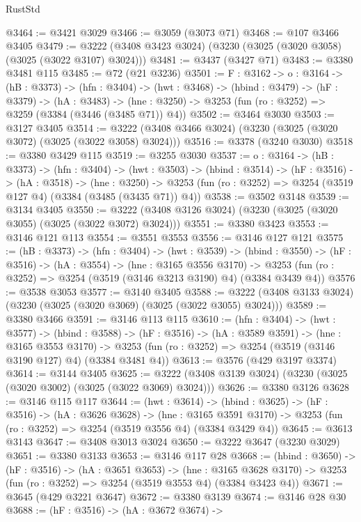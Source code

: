 \begin{lexlean}{RustStd}
\begin{coremodule}
{\begin{coremodule}
{{{{@3464 := @3421 @3029
@3466 := @3059 (@3073 @71)
@3468 := @107 @3466 @3405
@3479 := @3222 (@3408 @3423 @3024) (@3230 (@3025 (@3020 @3058) (@3025 (@3022 @3107) @3024)))
@3481 := @3437 (@3427 @71)
@3483 := @3380 @3481 @115
@3485 := @72 (@21 @3236)
@3501 := {F : @3162} ->
  {o : @3164} ->
  (hB : @3373) ->
  (hfn : @3404) ->
  (hwt : @3468) ->
  (hbind : @3479) ->
  (hF : @3379) ->
  (hA : @3483) -> (hne : @3250) -> @3253 (fun (ro : @3252) => @3259 (@3384 (@3446 (@3485 @71)) @4))
@3502 := @3464 @3030
@3503 := @3127 @3405
@3514 := @3222 (@3408 @3466 @3024) (@3230 (@3025 (@3020 @3072) (@3025 (@3022 @3058) @3024)))
@3516 := @3378 (@3240 @3030)
@3518 := @3380 @3429 @115
@3519 := @3255 @3030
@3537 := {o : @3164} ->
  (hB : @3373) ->
  (hfn : @3404) ->
  (hwt : @3503) ->
  (hbind : @3514) ->
  (hF : @3516) ->
  (hA : @3518) ->
  (hne : @3250) -> @3253 (fun (ro : @3252) => @3254 (@3519 @127 @4) (@3384 (@3485 (@3435 @71)) @4))
@3538 := @3502 @3148
@3539 := @3134 @3405
@3550 := @3222 (@3408 @3126 @3024) (@3230 (@3025 (@3020 @3055) (@3025 (@3022 @3072) @3024)))
@3551 := @3380 @3423
@3553 := @3146 @121 @113
@3554 := @3551 @3553
@3556 := @3146 @127 @121
@3575 := (hB : @3373) ->
  (hfn : @3404) ->
  (hwt : @3539) ->
  (hbind : @3550) ->
  (hF : @3516) ->
  (hA : @3554) ->
  (hne : @3165 @3556 @3170) ->
  @3253 (fun (ro : @3252) => @3254 (@3519 (@3146 @3213 @3190) @4) (@3384 @3439 @4))
@3576 := @3538 @3053
@3577 := @3140 @3405
@3588 := @3222 (@3408 @3133 @3024) (@3230 (@3025 (@3020 @3069) (@3025 (@3022 @3055) @3024)))
@3589 := @3380 @3466
@3591 := @3146 @113 @115
@3610 := (hfn : @3404) ->
  (hwt : @3577) ->
  (hbind : @3588) ->
  (hF : @3516) ->
  (hA : @3589 @3591) ->
  (hne : @3165 @3553 @3170) ->
  @3253 (fun (ro : @3252) => @3254 (@3519 (@3146 @3190 @127) @4) (@3384 @3481 @4))
@3613 := @3576 (@429 @3197 @3374)
@3614 := @3144 @3405
@3625 := @3222 (@3408 @3139 @3024) (@3230 (@3025 (@3020 @3002) (@3025 (@3022 @3069) @3024)))
@3626 := @3380 @3126
@3628 := @3146 @115 @117
@3644 := (hwt : @3614) ->
  (hbind : @3625) ->
  (hF : @3516) ->
  (hA : @3626 @3628) ->
  (hne : @3165 @3591 @3170) -> @3253 (fun (ro : @3252) => @3254 (@3519 @3556 @4) (@3384 @3429 @4))
@3645 := @3613 @3143
@3647 := @3408 @3013 @3024
@3650 := @3222 @3647 (@3230 @3029)
@3651 := @3380 @3133
@3653 := @3146 @117 @28
@3668 := (hbind : @3650) ->
  (hF : @3516) ->
  (hA : @3651 @3653) ->
  (hne : @3165 @3628 @3170) -> @3253 (fun (ro : @3252) => @3254 (@3519 @3553 @4) (@3384 @3423 @4))
@3671 := @3645 (@429 @3221 @3647)
@3672 := @3380 @3139
@3674 := @3146 @28 @30
@3688 := (hF : @3516) ->
  (hA : @3672 @3674) ->
}}}}
\end{coremodule}}
\end{coremodule}
\end{lexlean}

